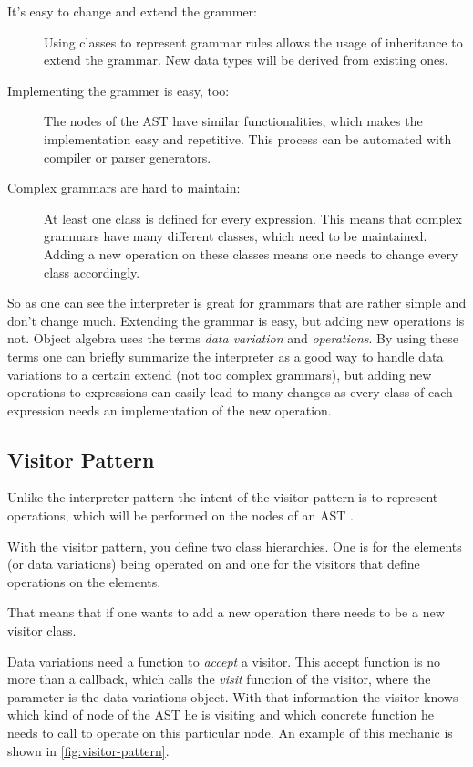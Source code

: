 \documentclass{llncs}
\begin{document}
\begin{description}
	\item[It's easy to change and extend the grammer:] Using classes to represent grammar rules allows the usage of inheritance to extend the grammar. New data types will be derived from existing ones.
	
	\item[Implementing the grammer is easy, too:] The nodes of the AST have similar functionalities, which makes the implementation easy and repetitive. This process can be automated with compiler or parser generators.
	
	\item[Complex grammars are hard to maintain:] At least one class is defined for every expression. This means that complex grammars have many different classes, which need to be maintained. Adding a new operation on these classes means one needs to change every class accordingly.
\end{description}

So as one can see the interpreter is great for grammars that are rather simple and don't change much. Extending the grammar is easy, but adding new operations is not. Object algebra uses the terms \emph{data variation} and \emph{operations}. By using these terms one can briefly summarize the interpreter as a good way to handle data variations to a certain extend (not too complex grammars), but adding new operations to expressions can easily lead to many changes as every class of each expression needs an implementation of the new operation.

\subsection{Visitor Pattern} \label{ssec:visitor}
Unlike the interpreter pattern the intent of the visitor pattern is to represent operations, which will be performed on the nodes of an AST \cite{GHJV94}.

With the visitor pattern, you define two class hierarchies. One is for the elements (or data variations) being operated on and one for the visitors that define operations on the elements. \cite{GHJV94}

That means that if one wants to add a new operation there needs to be a new visitor class.

Data variations need a function to \emph{accept} a visitor. This accept function is no more than a callback, which calls the \emph{visit} function of the visitor, where the parameter is the data variations object. With that information the visitor knows which kind of node of the AST he is visiting and which concrete function he needs to call to operate on this particular node. An example of this mechanic is shown in \autoref{fig:visitor-pattern}.
\end{document}
